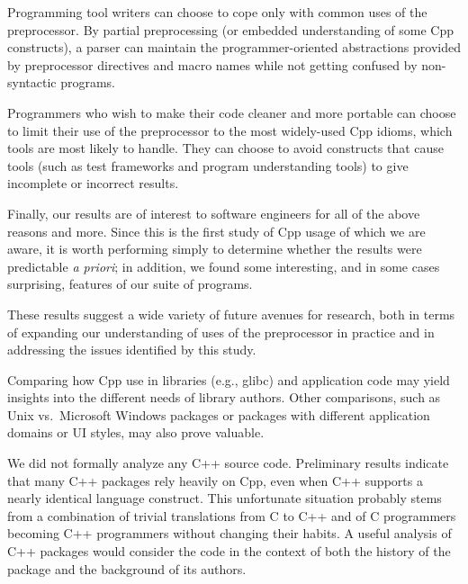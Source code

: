 \documentclass[10pt]{article}
\newcommand{\pkg}[1]{\textsf{#1}}
\begin{document}

Programming tool writers can choose to cope only with common uses of the
preprocessor.  By partial preprocessing (or embedded understanding of
some Cpp constructs), a parser can maintain the
programmer-oriented abstractions provided by preprocessor directives and
macro names while not getting confused by non-syntactic programs.

Programmers who wish to make their code cleaner and more portable can
choose to limit their use of the preprocessor to the most widely-used Cpp
idioms, which tools are most likely to handle.  They can choose to avoid
constructs that cause tools (such as test frameworks and program
understanding tools) to give incomplete or incorrect results.


Finally, our results are of interest to software engineers for all of the
above reasons and more.  Since this is the first study of Cpp usage of
which we are aware, it is worth performing simply to determine whether the
results were predictable \emph{a priori}; in addition, we found
some interesting, and in some cases surprising, features of our suite of
programs.


 
These results suggest a wide variety of future avenues for research, both
in terms of expanding our understanding of uses of the preprocessor in
practice and in addressing the issues identified by this study.

Comparing how Cpp use in libraries (e.g., \pkg{glibc}) and application code
may yield insights into the different needs of library authors.  Other
comparisons, such as Unix vs.~Microsoft Windows packages or packages with
different application domains or UI styles, may also prove valuable.

We did not formally analyze any C++ source code.  Preliminary results
indicate that many C++ packages rely heavily on Cpp, even when C++ supports
a nearly identical language construct.  This unfortunate situation probably
stems from a combination of trivial translations from C to C++ and of C
programmers becoming C++ programmers without changing their habits.  A
useful analysis of C++ packages would consider the code in the context of
both the history of the package and the background of its authors.
\end{document}
